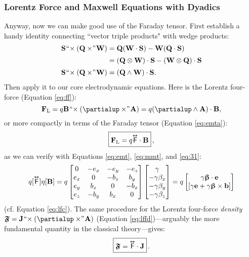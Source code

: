 \documentclass[12pt]{article}
\renewcommand{\vv}[1]{\mathbf{#1}}
\newcommand{\vvbeta}{\bm{\upbeta}}
\newcommand{\capdy}[1]{ \overset{ \text{\tiny$\bm\leftrightarrow$} }{\vphantom{\text{\small{A}}}\smash{#1}} }
\begin{document}
\subsubsection{Lorentz Force and Maxwell Equations with Dyadics}

Anyway, now we can make good use of the Faraday tensor. First establish a handy identity connecting ``vector triple products" with wedge products:
\begin{equation}\label{eq:vtpi}
\begin{split}
\vv S \mkern1mu `` \mkern-4mu \times (\vv Q \times \mkern-4mu " \mkern1mu \vv W) &= \vv Q ( \vv W \cdot \vv S) - \vv W ( \vv Q \cdot \vv S)  \\[2pt]
&= ( \vv Q \otimes \vv W ) \cdot \vv S - ( \vv W \otimes \vv Q ) \cdot \vv S \\[2pt]
\vv S \mkern1mu `` \mkern-4mu \times (\vv Q \times \mkern-4mu " \mkern1mu \vv W) &= ( \vv Q \wedge \vv W ) \cdot \vv S .
\end{split}
\end{equation}
Then apply it to our core electrodynamic equations. Here is the Lorentz four-force (Equation \ref{eq:ff}):
\begin{equation*}
\vv F_{\textrm{L}} = q \vv B \mkern1mu `` \mkern-4mu \times (\partialup \times \mkern-4mu " \mkern1mu \vv A) = q (\partialup \wedge \vv A) \cdot \vv B ,
\end{equation*}
or more compactly in terms of the Faraday tensor (Equation \ref{eq:emta}):
\begin{equation}\label{eq:lfffd}
\boxed{ \vphantom{A_{A_A}} \vv F_{\mathrm{L}} = q \capdy{\mathsf{F}} \cdot \vv B } \, ,
\end{equation}
as we can verify with Equations \ref{eq:emt}, \ref{eq:mmt}, and \ref{eq:31}:
\begin{equation*}
q [\capdy{\mathsf{F}}] \eta [\vv B]
=
q
\begin{bmatrix}
0 & -e_x & -e_y & -e_z \\
e_x & 0 & -b_z & b_y \\
e_y & b_z & 0 & -b_x \\
e_z & -b_y & b_x & 0
\end{bmatrix}
\begin{bmatrix}
\gamma \\
- \gamma \beta_x \\
- \gamma \beta_y \\
- \gamma \beta_z
\end{bmatrix}
=
q
\begin{bmatrix}
\gamma \vvbeta \cdot \vv e \\
[ \gamma \vv e + \gamma \vvbeta \times \vv b ]
\end{bmatrix}
\end{equation*}
(cf. Equation \ref{eq:lfc}). The same procedure for the Lorentz four-force \emph{density} ${\bm{\mathfrak{F}} = \vv J \mkern1mu `` \mkern-4mu \times (\partialup \times \mkern-4mu " \mkern1mu \vv A)}$ (Equation \ref{eq:lffd})---arguably the more fundamental quantity in the classical theory---gives:
\begin{equation}\label{eq:lffdfd}
\boxed{ \vphantom{A_{A_A}} \bm{\mathfrak{F}} = \capdy{\mathsf{F}} \cdot \vv J } \, .
\end{equation}
\end{document}

